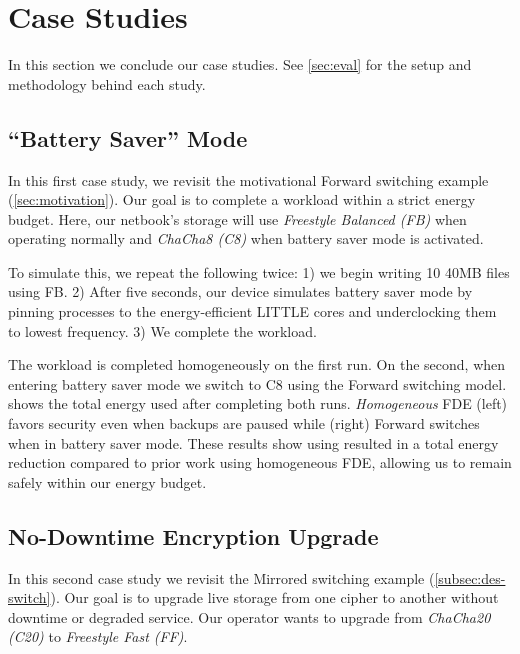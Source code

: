\section{Case Studies}\label{sec:usecases}

In this section we conclude our case studies. See \cref{sec:eval} for the setup
and methodology behind each study.


\subsection{``Battery Saver'' Mode}\label{subsec:usecase-battery}

In this first case study, we revisit the motivational Forward switching example
(\cref{sec:motivation}). Our goal is to complete a workload within a strict
energy budget. Here, our netbook's storage will use {\em Freestyle Balanced (FB)}
when operating normally and {\em ChaCha8 (C8)} when battery saver mode is
activated.



To simulate this, we repeat the following twice: 1) we begin writing 10 40MB
files using FB. 2) After five seconds, our device simulates battery saver mode
by pinning \sys processes to the energy-efficient LITTLE cores and underclocking
them to lowest frequency. 3) We complete the workload.

The workload is completed homogeneously on the first run. On the second, when
entering battery saver mode we switch to C8 using the Forward switching model.
 shows the total energy used after completing both
runs. {\em Homogeneous} FDE (left) favors security even when backups are paused
while \sys (right) Forward switches when in battery saver mode. These results
show using \sys resulted in a  total energy reduction compared to
prior work using homogeneous FDE, allowing us to remain safely within our energy
budget.


\subsection{No-Downtime Encryption Upgrade}\label{subsec:usecase-upgrade}

In this second case study we revisit the Mirrored switching example
(\cref{subsec:des-switch}). Our goal is to upgrade live storage from one cipher
to another without downtime or degraded service. Our operator wants to upgrade
from {\em ChaCha20 (C20)} to {\em Freestyle Fast (FF)}.

